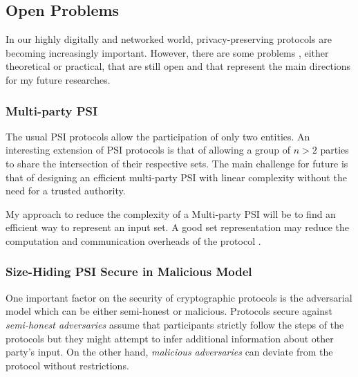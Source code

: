 \documentclass[dvips,12pt]{article}
\begin{document}

\subsection{Open Problems}
In our highly digitally and networked world, privacy-preserving protocols are becoming increasingly important. 
However, there are some problems \cite{dissertation}, either theoretical or practical, that are still open and that represent the main directions for my future researches.
\subsubsection{Multi-party PSI}
The usual PSI protocols allow the participation of only two entities. 
An interesting extension of PSI protocols is that of allowing a group of $n > 2$ parties to share the intersection of their respective sets. The main challenge for future is that of designing an efficient multi-party PSI with linear complexity without the need for a trusted authority.

My approach to reduce the complexity of a Multi-party PSI will be to find an efficient way to represent an input set. A good set representation may reduce the computation and communication overheads of the protocol \cite{quasi-linear}. 

\subsubsection{Size-Hiding PSI Secure in Malicious Model}
One important factor on the security of cryptographic protocols is the adversarial model which can be either semi-honest or malicious. 
Protocols secure against \emph{semi-honest adversaries} assume that participants strictly follow the steps of the protocols but they might attempt to infer additional information about other party's input. On the other hand, \emph{malicious adversaries} can deviate from the protocol without restrictions.
\end{document}
